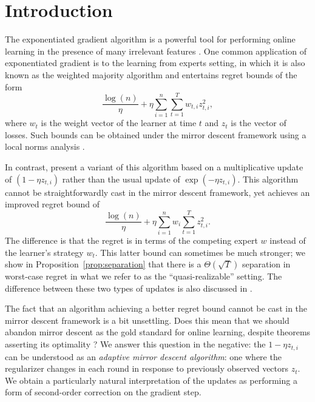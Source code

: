 \documentclass[paper_icml.tex]{subfiles}
\begin{document}
\section{Introduction} 
\label{sec:intro}
The exponentiated gradient algorithm is a powerful tool for performing online 
learning in the presence of many irrelevant features 
\cite{kivinen1997, littlestone1988}. One common application of exponentiated 
gradient is to the learning from experts setting, in which it is also known 
as the weighted majority algorithm \cite{wm} and entertains regret bounds of the 
form 
\[ \frac{\log(n)}{\eta} + \eta \sum_{i=1}^n \sum_{t=1}^T w_{t,i}z_{t,i}^2, \]
where $w_t$ is the weight vector of the learner at time $t$ and $z_t$ is the 
vector of losses. Such bounds can be obtained under the mirror descent 
framework using a local norms analysis \cite{shalev2011}. 

In contrast, \cite{cesa2007} present a variant 
of this algorithm based on a multiplicative update of $(1 - \eta z_{t,i})$ rather 
than the usual update of $\exp(-\eta z_{t,i})$. This algorithm cannot be 
straightforwardly cast in the mirror descent framework, yet achieves an 
improved  regret bound of
\begin{equation}
\label{eqn:mw-regret}
\frac{\log(n)}{\eta} + \eta \sum_{i=1}^n w_i \sum_{t=1}^T z_{t,i}^2.
\end{equation}
The difference is that the regret is in terms of the competing expert $w$ instead 
of the learner's strategy $w_t$. This latter bound can sometimes be much 
stronger; we show in Proposition~\ref{prop:separation} that there is a 
$\Theta(\sqrt{T})$ separation in worst-case regret in what we refer to as the 
``quasi-realizable'' setting. The difference between these two types of updates 
is also discussed in \cite{mw-survey}. %

The fact that an algorithm achieving a better regret bound cannot be cast in the 
mirror descent framework is a bit unsettling. Does this mean that we should 
abandon mirror descent as the gold standard for online learning, despite 
theorems asserting its optimality \cite{srebro2011}? We answer this question 
in the negative: the $1-\eta z_{t,i}$ can be understood as an \emph{adaptive 
mirror descent algorithm}: one where the regularizer changes in each round 
in response to previously observed vectors $z_t$. We obtain a 
particularly natural interpretation of the updates as performing a form of 
second-order correction on the gradient step.
\end{document}

